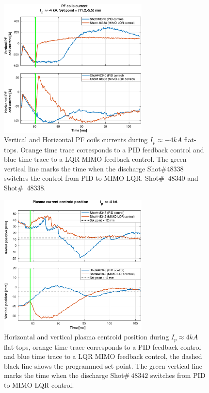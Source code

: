 \begin{figure}
	\centering
	\includegraphics[width=0.67\textwidth]{Chp5/PIDvsMIMO_340_338_curr_2.eps}
	\caption{ Vertical and Horizontal PF coils currents during  $I_p\approx -4kA$  flat-tops. Orange time trace corresponds to a PID feedback control and blue time trace to a LQR MIMO feedback control. The green vertical line marks the time  when the  discharge Shot$\# 48338$ switches the control from PID to MIMO LQR. Shot$\#~$ 48340 and Shot$\#~$ 48338.}
\end{figure}

\begin{figure}
	\centering
	\includegraphics[width=0.67\textwidth]{Chp5/PIDvsMIMO_343_342_2.eps}
	\caption{Horizontal and vertical plasma centroid position during  $I_p\approx 4kA$  flat-tops, orange time trace corresponds to a PID feedback control and blue time trace to a LQR MIMO feedback control, the dashed black line shows the programmed set point. The green vertical line marks the time  when the  discharge Shot$\# ~48342$ switches  from PID to MIMO LQR control.}
\end{figure}

